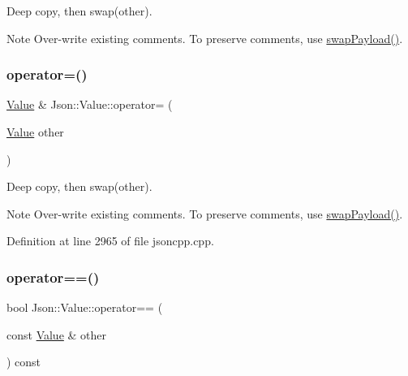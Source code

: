 Deep copy, then swap(other). \begin{DoxyNote}{Note}
Over-\/write existing comments. To preserve comments, use \hyperlink{class_json_1_1_value_a5263476047f20e2fc6de470e4de34fe5}{swap\+Payload()}. 
\end{DoxyNote}
\hypertarget{class_json_1_1_value_a795acb28772da4c5d85ae8f4af36c69f}{}\label{class_json_1_1_value_a795acb28772da4c5d85ae8f4af36c69f} 
\subsubsection{\texorpdfstring{operator=()}{operator=()}\hspace{0.1cm}{\footnotesize\ttfamily [2/2]}}
{\footnotesize\ttfamily \hyperlink{class_json_1_1_value}{Value} \& Json\+::\+Value\+::operator= (\begin{DoxyParamCaption}\item[{\hyperlink{class_json_1_1_value}{Value}}]{other }\end{DoxyParamCaption})}

Deep copy, then swap(other). \begin{DoxyNote}{Note}
Over-\/write existing comments. To preserve comments, use \hyperlink{class_json_1_1_value_a5263476047f20e2fc6de470e4de34fe5}{swap\+Payload()}. 
\end{DoxyNote}


Definition at line 2965 of file jsoncpp.\+cpp.

\hypertarget{class_json_1_1_value_a16f9250e30d5c4505cd11137c564a764}{}\label{class_json_1_1_value_a16f9250e30d5c4505cd11137c564a764} 
\subsubsection{\texorpdfstring{operator==()}{operator==()}\hspace{0.1cm}{\footnotesize\ttfamily [1/2]}}
{\footnotesize\ttfamily bool Json\+::\+Value\+::operator== (\begin{DoxyParamCaption}\item[{const \hyperlink{class_json_1_1_value}{Value} \&}]{other }\end{DoxyParamCaption}) const}

\hypertarget{class_json_1_1_value_a16f9250e30d5c4505cd11137c564a764}{}\label{class_json_1_1_value_a16f9250e30d5c4505cd11137c564a764} 
